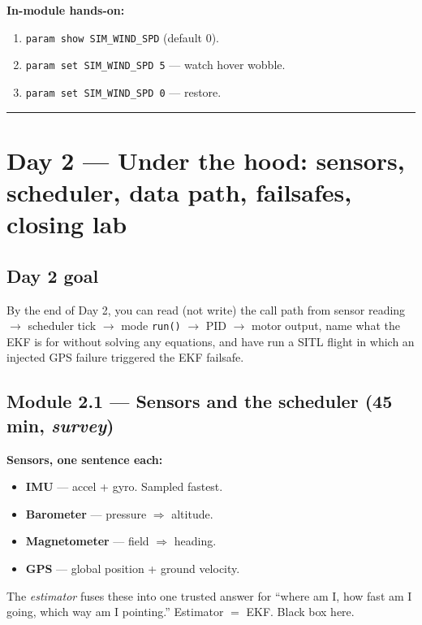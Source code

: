 \documentclass[a4paper,11pt,twoside]{article}
\begin{document}
\textbf{In-module hands-on:}
\begin{enumerate}
  \item \texttt{param show SIM\_WIND\_SPD} (default 0).
  \item \texttt{param set SIM\_WIND\_SPD 5} --- watch hover wobble.
  \item \texttt{param set SIM\_WIND\_SPD 0} --- restore.
\end{enumerate}

\hrule\bigskip
\section{Day 2 --- Under the hood: sensors, scheduler, data path, failsafes, closing lab}

\subsection*{Day 2 goal}
By the end of Day 2, you can read (not write) the call path from sensor reading $\rightarrow$ scheduler tick $\rightarrow$ mode \texttt{run()} $\rightarrow$ PID $\rightarrow$ motor output, name what the EKF is for without solving any equations, and have run a SITL flight in which an injected GPS failure triggered the EKF failsafe.

\subsection{Module 2.1 --- Sensors and the scheduler (45 min, \emph{survey})}

\textbf{Sensors, one sentence each:}
\begin{itemize}
  \item \textbf{IMU} --- accel + gyro. Sampled fastest.
  \item \textbf{Barometer} --- pressure $\Rightarrow$ altitude.
  \item \textbf{Magnetometer} --- field $\Rightarrow$ heading.
  \item \textbf{GPS} --- global position + ground velocity.
\end{itemize}
The \emph{estimator} fuses these into one trusted answer for ``where am I, how fast am I going, which way am I pointing.'' Estimator $=$ EKF. Black box here.
\end{document}
